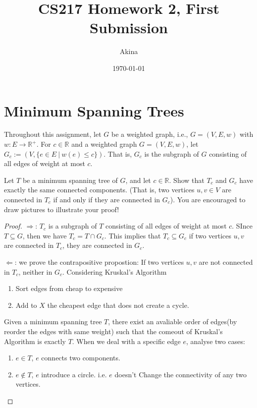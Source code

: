\documentclass[11pt,a4paper,oneside]{article}
\newcommand{\R}{\mathbb{R}}
\renewcommand{\hwtitle} {CS217 Homework 2, First Submission}
\renewcommand{\hwauthor}{Akina}
\renewcommand{\hwdate}{\today}
\begin{document}
\title{\hwtitle}
\author{\hwauthor}
\date{\hwdate}
\maketitle

\section*{Minimum Spanning Trees}

Throughout this assignment, let $G$ be a weighted graph, i.e., $G=(V,E,w)$ 
with $w: E \rightarrow \R^+$.
For $c \in \R$ and a weighted graph $G = (V,E,w)$, let
$G_c := (V, \{e \in E \ | \ w(e) \leq c\})$. That is, $G_c$ is the
subgraph of $G$ consisting of all edges of weight at most $c$.

\begin{problem}{1}
	\statement
	Let $T$ be a minimum spanning tree of $G$, and let $c \in \R$.  Show that
	$T_c$ and $G_c$ have exactly the same connected components.  (That
	is, two vertices $u,v \in V$ are connected in $T_c$ if and only if
	they are connected in $G_c$).
	You are encouraged to draw pictures to illustrate your proof!
	\solution
	
	\begin{proof}
		\(\Rightarrow\): \(T_c\) is a subgraph of \(T\) consisting of all edges of weight at most \(c\). SInce \(T \subseteq G\), then we have  \(T_c = T \cap G_c\). This implies that \(T_c \subseteq G_c\) if two vertices \(u, v\) are connected in \(T_c\), they are connected in \(G_c\).
		
		\(\Leftarrow\): we prove the contrapositive propostion: If two vertices \(u, v\) are not connected in \(T_c\), neither in \(G_c\). Considering Kruskal’s Algorithm
		
		\begin{enumerate}
			\item Sort edges from cheap to expensive
			\item Add to \(X\) the cheapest edge that does not create a cycle.
		\end{enumerate}
	
		Given a minimum spanning tree \(T\), there exist an avaliable order of edges(by reorder the edges with same weight) such that the comeout of Kruskal's Algorithm is exactly \(T\). When we deal with a specific edge \(e\), analyse two cases: 
		
		\begin{enumerate}
			\item \(e \in T\), \(e\) connects two components.
			\item \(e \not\in T\), \(e\) introduce a circle. i.e. \(e\) doesn't Change the connectivity of any two vertices.
		\end{enumerate}
	

\end{proof}
\end{problem}
\end{document}
